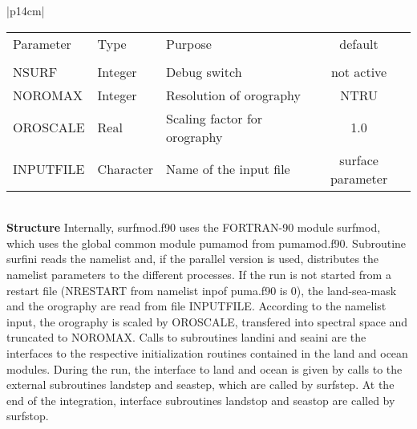 \begin{center}
\begin{tabular}{|p{14cm}|}
\begin{center}
\begin{tabular}{l l p{5cm} c} %
Parameter & Type & Purpose & default \\
&&&\\
NSURF & Integer & Debug switch  & not active \\
NOROMAX & Integer & Resolution of orography & NTRU \\
OROSCALE & Real & Scaling factor for orography & 1.0 \\
INPUTFILE& Character & Name of the input file & surface\underline{ }parameter  
\end{tabular} 
\end{center}
\vspace{3mm} \\
\hline
\vspace{2mm} {\bf Structure} Internally, {\module surfmod.f90} uses the FORTRAN-90
module {\modu surfmod}, which uses the global common module {\modu pumamod} from
{\module pumamod.f90}. Subroutine {\sub surfini} reads the namelist and, if the parallel
version
is used,  distributes the namelist parameters to the different processes. If the run is not started
from a restart file (NRESTART from namelist {\nam inp}of {\module puma.f90} is 0), the
land-sea-mask and the
orography are read from file {\file INPUTFILE}. According to the namelist input, the
orography
is scaled by OROSCALE, transfered into spectral space and truncated to NOROMAX. Calls to
subroutines {\sub landini} and {\sub seaini} are the interfaces to the respective initialization
routines contained in the land and ocean modules. During the run, the interface to land and
ocean
is given by calls to the external subroutines {\sub landstep} and {\sub seastep}, which are called
by {\sub surfstep}. At the end of the integration, interface subroutines {\sub landstop} and {\sub
seastop} are called by {\sub surfstop}. \vspace{3mm} \\
\hline
\end{tabular}
\end{center} 
\newpage

